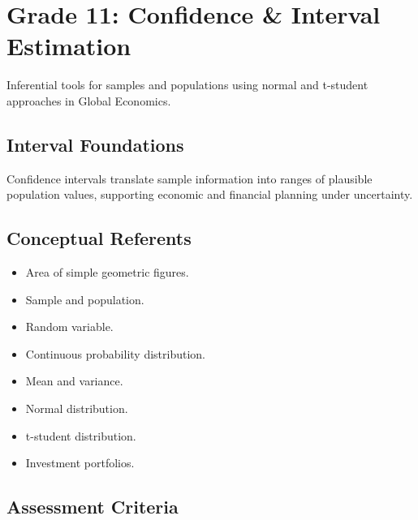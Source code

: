 \chapter{Grade 11: Confidence \& Interval Estimation}\label{sec:grade11-confidence}

Inferential tools for samples and populations using normal and t-student approaches in Global Economics.

\section{Interval Foundations}\label{sec:interval-foundations}

Confidence intervals translate sample information into ranges of plausible population values, supporting economic and financial planning under uncertainty.

\section{Conceptual Referents}\label{sec:conceptual-referents-intervals}

\begin{itemize}
	\item Area of simple geometric figures.
	\item Sample and population.
	\item Random variable.
	\item Continuous probability distribution.
	\item Mean and variance.
	\item Normal distribution.
	\item t-student distribution.
	\item Investment portfolios.
\end{itemize}

\section{Assessment Criteria}\label{sec:assessment-criteria-intervals}

